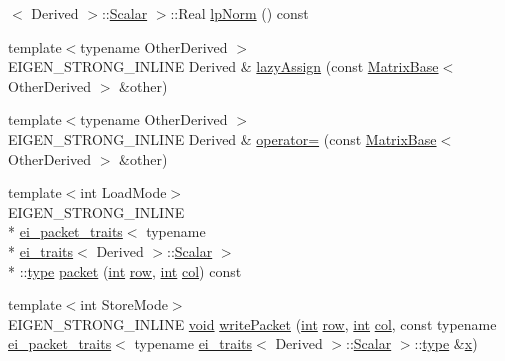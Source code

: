 \begin{DoxyCompactItemize}
$<$ Derived $>$\-::\hyperlink{class_matrix_base_a625df8339dc2d816cbc0fd66e7dadaf5}{Scalar} $>$\-::Real \hyperlink{class_matrix_base_ac103af038592a18d277b1a27abeb4091}{lp\-Norm} () const 
\item 
{\footnotesize template$<$typename Other\-Derived $>$ }\\E\-I\-G\-E\-N\-\_\-\-S\-T\-R\-O\-N\-G\-\_\-\-I\-N\-L\-I\-N\-E Derived \& \hyperlink{class_matrix_base_ad00936a4ccfc7c5a437421f450201857}{lazy\-Assign} (const \hyperlink{class_matrix_base}{Matrix\-Base}$<$ Other\-Derived $>$ \&other)
\item 
{\footnotesize template$<$typename Other\-Derived $>$ }\\E\-I\-G\-E\-N\-\_\-\-S\-T\-R\-O\-N\-G\-\_\-\-I\-N\-L\-I\-N\-E Derived \& \hyperlink{class_matrix_base_ad5f1a6747515d46f4c6382894e69cb9b}{operator=} (const \hyperlink{class_matrix_base}{Matrix\-Base}$<$ Other\-Derived $>$ \&other)
\item 
{\footnotesize template$<$int Load\-Mode$>$ }\\E\-I\-G\-E\-N\-\_\-\-S\-T\-R\-O\-N\-G\-\_\-\-I\-N\-L\-I\-N\-E \\*
\hyperlink{structei__packet__traits}{ei\-\_\-packet\-\_\-traits}$<$ typename \\*
\hyperlink{structei__traits}{ei\-\_\-traits}$<$ Derived $>$\-::\hyperlink{class_matrix_base_a625df8339dc2d816cbc0fd66e7dadaf5}{Scalar} $>$\\*
\-::\hyperlink{glext_8h_a7d05960f4f1c1b11f3177dc963a45d86}{type} \hyperlink{class_matrix_base_ab99a7d3e1ab304a09c4da567615e0df6}{packet} (\hyperlink{ioapi_8h_a787fa3cf048117ba7123753c1e74fcd6}{int} \hyperlink{glext_8h_a11b277b422822f784ee248b43eee3e1e}{row}, \hyperlink{ioapi_8h_a787fa3cf048117ba7123753c1e74fcd6}{int} \hyperlink{class_matrix_base_ae3c94b0f25b4273c7a8125169bdf60e0}{col}) const 
\item 
{\footnotesize template$<$int Store\-Mode$>$ }\\E\-I\-G\-E\-N\-\_\-\-S\-T\-R\-O\-N\-G\-\_\-\-I\-N\-L\-I\-N\-E \hyperlink{group___u_a_v_objects_plugin_ga444cf2ff3f0ecbe028adce838d373f5c}{void} \hyperlink{class_matrix_base_a6c8c385355a4c4254a921ab76dae9da7}{write\-Packet} (\hyperlink{ioapi_8h_a787fa3cf048117ba7123753c1e74fcd6}{int} \hyperlink{glext_8h_a11b277b422822f784ee248b43eee3e1e}{row}, \hyperlink{ioapi_8h_a787fa3cf048117ba7123753c1e74fcd6}{int} \hyperlink{class_matrix_base_ae3c94b0f25b4273c7a8125169bdf60e0}{col}, const typename \hyperlink{structei__packet__traits}{ei\-\_\-packet\-\_\-traits}$<$ typename \hyperlink{structei__traits}{ei\-\_\-traits}$<$ Derived $>$\-::\hyperlink{class_matrix_base_a625df8339dc2d816cbc0fd66e7dadaf5}{Scalar} $>$\-::\hyperlink{glext_8h_a7d05960f4f1c1b11f3177dc963a45d86}{type} \&\hyperlink{glext_8h_a1db9d104e3c2128177f26aff7b46982f}{x})

\end{DoxyCompactItemize}

